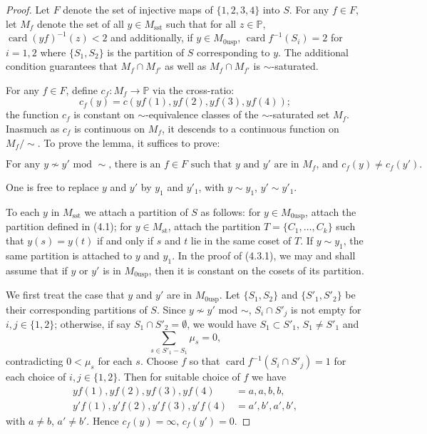 \documentclass[12pt,a4paper]{article}
\theoremstyle{plain}
\theoremstyle{definition}
\theoremstyle{remark}
\DeclareMathOperator{\card}{card}
\newcommand{\PP}{\mathbb{P}}
\numberwithin{equation}{section}
\providecommand{\PP}{\mathbb{P}}
\begin{document}
\begin{proof}
Let $F$ denote the set of injective maps of $\{1, 2, 3, 4\}$ into $S$. For any $f \in F$, let $M_f$ denote the set of all $y \in M_{\mathrm{sst}}$ such that for all $z \in \PP$, $\card(yf)^{-1}(z) < 2$ and additionally, if $y \in M_{0\mathrm{usp}}$, $\card f^{-1}(S_i) = 2$ for $i = 1, 2$ where $\{S_1, S_2\}$ is the partition of $S$ corresponding to $y$. The additional condition guarantees that $M_f \cap M_{f'}$ as well as $M_f \cap M_{f'}$ is $\sim$-saturated.

For any $f \in F$, define $c_f: M_f \to \PP$ via the cross-ratio:
\[
c_f(y) = c(yf(1), yf(2), yf(3), yf(4));
\]
the function $c_f$ is constant on $\sim$-equivalence classes of the $\sim$-saturated set $M_f$. Inasmuch as $c_f$ is continuous on $M_f$, it descends to a continuous function on $M_f/\sim$. To prove the lemma, it suffices to prove:

\begin{equation}\label{eq:4.3.1}
\text{For any $y \not\sim y'$ mod $\sim$, there is an $f \in F$ such that $y$ and $y'$ are in $M_f$, and $c_f(y) \neq c_f(y')$.}
\end{equation}

One is free to replace $y$ and $y'$ by $y_1$ and $y'_1$, with $y \sim y_1$, $y' \sim y'_1$.

To each $y$ in $M_{\mathrm{sst}}$ we attach a partition of $S$ as follows: for $y \in M_{0\mathrm{usp}}$, attach the partition defined in (4.1); for $y \in M_{\mathrm{st}}$, attach the partition $T = \{C_1, \ldots, C_k\}$ such that $y(s) = y(t)$ if and only if $s$ and $t$ lie in the same coset of $T$. If $y \sim y_1$, the same partition is attached to $y$ and $y_1$. In the proof of (4.3.1), we may and shall assume that if $y$ or $y'$ is in $M_{0\mathrm{usp}}$, then it is constant on the cosets of its partition.

We first treat the case that $y$ and $y'$ are in $M_{0\mathrm{usp}}$. Let $\{S_1, S_2\}$ and $\{S'_1, S'_2\}$ be their corresponding partitions of $S$. Since $y \not\sim y'$ mod $\sim$, $S_i \cap S'_j$ is not empty for $i, j \in \{1, 2\}$; otherwise, if say $S_1 \cap S'_2 = \emptyset$, we would have $S_1 \subset S'_1$, $S_1 \neq S'_1$ and
\[
\sum_{s \in S'_1 - S_1} \mu_s = 0,
\]
contradicting $0 < \mu_s$ for each $s$. Choose $f$ so that $\card f^{-1}(S_i \cap S'_j) = 1$ for each choice of $i, j \in \{1, 2\}$. Then for suitable choice of $f$ we have
\begin{align*}
yf(1), yf(2), yf(3), yf(4) &= a, a, b, b, \\
y'f(1), y'f(2), y'f(3), y'f(4) &= a', b', a', b',
\end{align*}
with $a \neq b$, $a' \neq b'$. Hence $c_f(y) = \infty$, $c_f(y') = 0$.


\end{proof}
\end{document}
